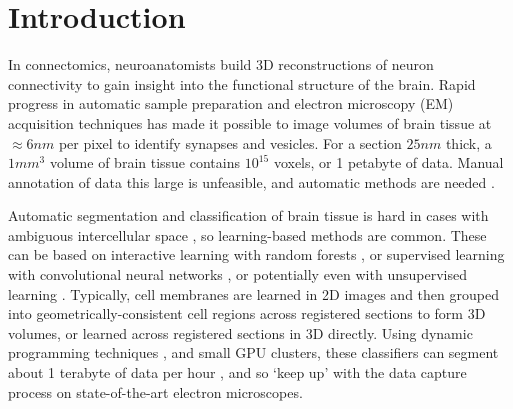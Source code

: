 \section{Introduction}


In connectomics, neuroanatomists build 3D reconstructions of neuron connectivity to gain insight into the functional structure of the brain. Rapid progress in automatic sample preparation and electron microscopy (EM) acquisition techniques has made it possible to image volumes of brain tissue at $\approx6nm$ per pixel to identify synapses and vesicles. For a section $25nm$ thick, a $1 mm^3$ volume of brain tissue contains $10^{15}$ voxels, or 1 petabyte of data. Manual annotation of data this large is unfeasible, and automatic methods are needed \cite{jain2010,kaynig13,Liu2014,NunezIglesias2013Machine,GALA2014,amelio_segmentation}.

Automatic segmentation and classification of brain tissue is hard in cases with ambiguous intercellular space \cite{isbi_challenge}, so learning-based methods are common. These can be based on interactive learning with random forests \cite{neuroproof2013,amelio_segmentation,kaynig13}, or supervised learning with convolutional neural networks \cite{RonnebergerFB15,lee2015recursive}, or potentially even with unsupervised learning \cite{BogovicHJ13}. Typically, cell membranes are learned in 2D images and then grouped into geometrically-consistent cell regions across registered sections to form 3D volumes, or learned across registered sections in 3D directly. Using dynamic programming techniques , and small GPU clusters, these classifiers can segment about 1 terabyte of data per hour \cite{kasthuri2015saturated}, and so `keep up' with the data capture process on state-of-the-art electron microscopes.


